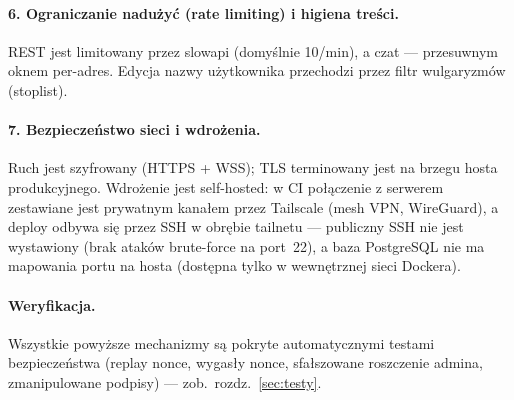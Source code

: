 \paragraph{6. Ograniczanie nadużyć (rate limiting) i higiena treści.}
REST jest limitowany przez slowapi (domyślnie 10/min), a czat — przesuwnym oknem
per-adres. Edycja nazwy użytkownika przechodzi przez filtr wulgaryzmów (stoplist).

\paragraph{7. Bezpieczeństwo sieci i wdrożenia.}
Ruch jest szyfrowany (HTTPS + WSS); TLS terminowany jest na brzegu hosta produkcyjnego.
Wdrożenie jest self-hosted: w CI połączenie z serwerem zestawiane jest prywatnym kanałem
przez Tailscale (mesh VPN, WireGuard), a deploy odbywa się przez SSH w obrębie tailnetu —
publiczny SSH nie jest wystawiony (brak ataków brute-force na port~22), a baza PostgreSQL
nie ma mapowania portu na hosta (dostępna tylko w wewnętrznej sieci Dockera).

\paragraph{Weryfikacja.}
Wszystkie powyższe mechanizmy są pokryte automatycznymi testami bezpieczeństwa
(replay nonce, wygasły nonce, sfałszowane roszczenie admina, zmanipulowane podpisy) —
zob.\ rozdz.~\ref{sec:testy}.
